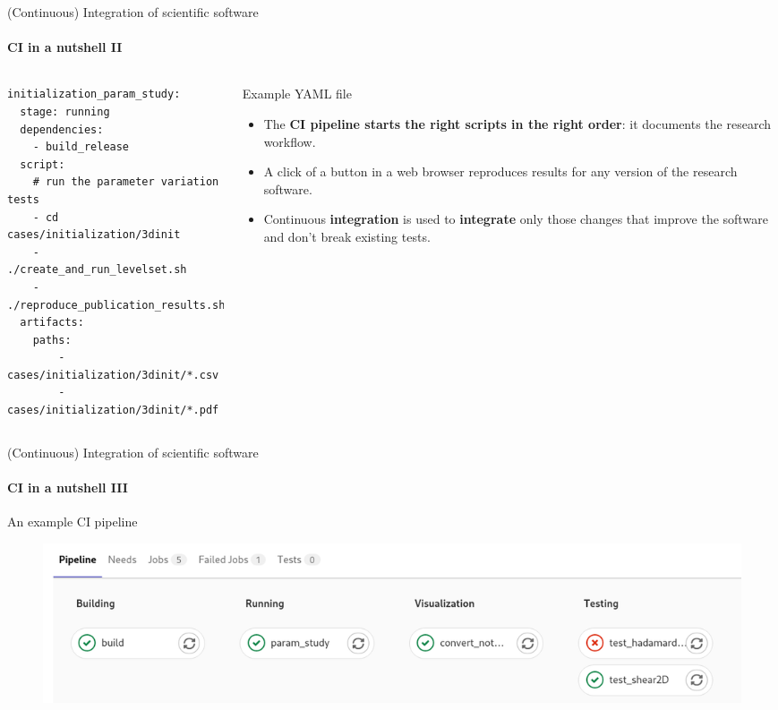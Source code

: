 \begin{frame}[fragile]{(Continuous) Integration of scientific software} 
\framesubtitle{CI in a nutshell II}

    \begin{columns}
        \begin{column}[c]{0.5\textwidth}
            \begin{verbatim}
initialization_param_study:
  stage: running
  dependencies:
    - build_release
  script: 
    # run the parameter variation tests 
    - cd cases/initialization/3dinit
    - ./create_and_run_levelset.sh
    - ./reproduce_publication_results.sh
  artifacts:
    paths:
        - cases/initialization/3dinit/*.csv 
        - cases/initialization/3dinit/*.pdf 
            \end{verbatim}
        \end{column}
        \begin{column}[c]{0.5\textwidth}
            Example YAML file
            \begin{itemize}
                \item The \textbf{CI pipeline starts the right scripts in the right order}: it documents the research workflow.
                \item A click of a button in a web browser reproduces results for any version of the research software.
                \item Continuous \textbf{integration} is used to \textbf{integrate} only those changes that improve the software and don't break existing tests.
            \end{itemize}
        \end{column}
    \end{columns}

\end{frame}

\begin{frame}[fragile]{(Continuous) Integration of scientific software} 
\framesubtitle{CI in a nutshell III}

    \vfill

    An example CI pipeline 
    \begin{figure}
        \includegraphics[width=\textwidth]{figures/pipeline-example.png}
    \end{figure}

\end{frame}

